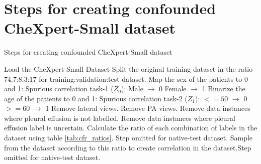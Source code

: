 \documentclass[12pt,DIV14,BCOR12mm,a4paper,footinclude=false,headinclude,parskip=half-,twoside,openright,cleardoublepage=empty,toc=index,bibliography=totoc,listof=totoc]{scrreprt}
\numberwithin{equation}{chapter}
\begin{document}
\section{Steps for creating confounded CheXpert-Small dataset}
\begin{algorithm}[H]
\caption{Steps for creating confounded CheXpert-Small dataset}
\label{alg:create_chxpert}
\begin{algorithmic}[1]
\State Load the CheXpert-Small Dataset 
\State Split the original training dataset in the ratio 74.7:8.3:17 for training:validation:test dataset. 
\State Map the sex of the patients to 0 and 1:
\Statex \hspace{\algorithmicindent} Spurious correlation task-1 ($Z_0$): \hspace{0.5cm} Male $\rightarrow$ 0 \hspace{0.5cm} Female $\rightarrow$ 1
\State Binarize the age of the patients to 0 and 1:
\Statex \hspace{\algorithmicindent} Spurious correlation task-2 ($Z_1$): \hspace{0.5cm} $<=50$ $\rightarrow$ 0 \hspace{0.5cm} $>=60$ $\rightarrow$ 1
\State Remove lateral views.
\State Remove PA views.
\State Remove data instances where pleural effusion is not labelled.
\State Remove data instances where pleural effusion label is uncertain.
\State Calculate the ratio of each combination of labels in the dataset using table \ref{tab:cfr_ratios}. Step omitted for native-test dataset.
\State Sample from the dataset according to this ratio to create correlation in the dataset.Step omitted for native-test dataset.
\end{algorithmic}
\end{algorithm}
\end{document}
